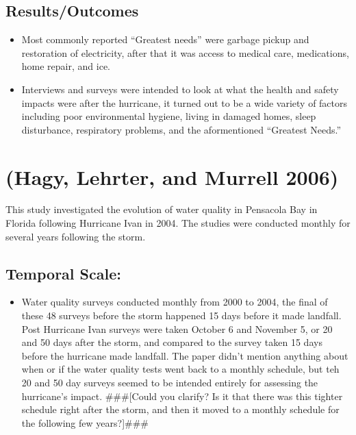 \documentclass[
]{article}
\providecommand{\tightlist}{%
  \setlength{\itemsep}{0pt}\setlength{\parskip}{0pt}}
\begin{document}
\hypertarget{resultsoutcomes-1}{%
\subsection{Results/Outcomes}\label{resultsoutcomes-1}}

\begin{itemize}
\tightlist
\item
  Most commonly reported ``Greatest needs'' were garbage pickup and
  restoration of electricity, after that it was access to medical care,
  medications, home repair, and ice.
\item
  Interviews and surveys were intended to look at what the health and
  safety impacts were after the hurricane, it turned out to be a wide
  variety of factors including poor environmental hygiene, living in
  damaged homes, sleep disturbance, respiratory problems, and the
  aformentioned ``Greatest Needs.''
\end{itemize}

\hypertarget{hagy2006effects}{%
\section{(Hagy, Lehrter, and Murrell 2006)}\label{hagy2006effects}}

This study investigated the evolution of water quality in Pensacola Bay
in Florida following Hurricane Ivan in 2004. The studies were conducted
monthly for several years following the storm.

\hypertarget{temporal-scale-2}{%
\subsection{Temporal Scale:}\label{temporal-scale-2}}

\begin{itemize}
\tightlist
\item
  Water quality surveys conducted monthly from 2000 to 2004, the final
  of these 48 surveys before the storm happened 15 days before it made
  landfall. Post Hurricane Ivan surveys were taken October 6 and
  November 5, or 20 and 50 days after the storm, and compared to the
  survey taken 15 days before the hurricane made landfall. The paper
  didn't mention anything about when or if the water quality tests went
  back to a monthly schedule, but teh 20 and 50 day surveys seemed to be
  intended entirely for assessing the hurricane's impact. \#\#\#{[}Could
  you clarify? Is it that there was this tighter schedule right after
  the storm, and then it moved to a monthly schedule for the following
  few years?{]}\#\#\#
\end{itemize}
\end{document}
